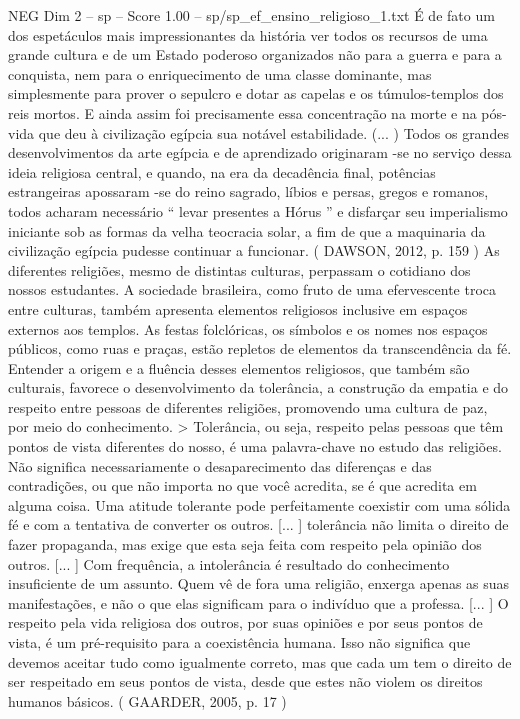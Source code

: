 \begin{textsample}{NEG Dim 2 – sp – Score 1.00 – sp/sp\_ef\_ensino\_religioso\_1.txt}
É de fato um dos espetáculos mais impressionantes da história ver todos os recursos de uma grande cultura e de um Estado poderoso organizados não para a guerra e para a conquista, nem para o enriquecimento de uma classe dominante, mas simplesmente para prover o sepulcro e dotar as capelas e os túmulos-templos dos reis mortos.
E ainda assim foi precisamente essa concentração na morte e na pós-vida que deu à civilização egípcia sua notável estabilidade. (... ) Todos os grandes desenvolvimentos da arte egípcia e de aprendizado originaram -se no serviço dessa ideia religiosa central, e quando, na era da decadência final, potências estrangeiras apossaram -se do reino sagrado, líbios e persas, gregos e romanos, todos acharam necessário “ levar presentes a Hórus ” e disfarçar seu imperialismo iniciante sob as formas da velha teocracia solar, a fim de que a maquinaria da civilização egípcia pudesse continuar a funcionar. ( DAWSON, 2012, p. 159 ) As diferentes religiões, mesmo de distintas culturas, perpassam o cotidiano dos nossos estudantes.
A sociedade brasileira, como fruto de uma efervescente troca entre culturas, também apresenta elementos religiosos inclusive em espaços externos aos templos.
As festas folclóricas, os símbolos e os nomes nos espaços públicos, como ruas e praças, estão repletos de elementos da transcendência da fé.
Entender a origem e a fluência desses elementos religiosos, que também são culturais, favorece o desenvolvimento da tolerância, a construção da empatia e do respeito entre pessoas de diferentes religiões, promovendo uma cultura de paz, por meio do conhecimento. > Tolerância, ou seja, respeito pelas pessoas que têm pontos de vista diferentes do nosso, é uma palavra-chave no estudo das religiões.
Não significa necessariamente o desaparecimento das diferenças e das contradições, ou que não importa no que você acredita, se é que acredita em alguma coisa.
Uma atitude tolerante pode perfeitamente coexistir com uma sólida fé e com a tentativa de converter os outros. [... ] tolerância não limita o direito de fazer propaganda, mas exige que esta seja feita com respeito pela opinião dos outros. [... ] Com frequência, a intolerância é resultado do conhecimento insuficiente de um assunto.
Quem vê de fora uma religião, enxerga apenas as suas manifestações, e não o que elas significam para o indivíduo que a professa. [... ] O respeito pela vida religiosa dos outros, por suas opiniões e por seus pontos de vista, é um pré-requisito para a coexistência humana.
Isso não significa que devemos aceitar tudo como igualmente correto, mas que cada um tem o direito de ser respeitado em seus pontos de vista, desde que estes não violem os direitos humanos básicos. ( GAARDER, 2005, p. 17 )

\end{textsample}
